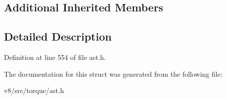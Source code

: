 \subsection*{Additional Inherited Members}


\subsection{Detailed Description}


Definition at line 554 of file ast.\+h.



The documentation for this struct was generated from the following file\+:\begin{DoxyCompactItemize}
\item 
v8/src/torque/ast.\+h\end{DoxyCompactItemize}
